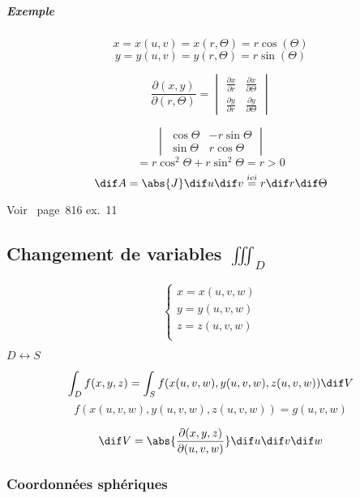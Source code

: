 \subparagraph{Exemple}



$$x=x(u,v)=x(r,\Theta)=r\cos(\Theta)$$
$$y=y(u,v)=y(r,\Theta)=r\sin(\Theta)$$





\[
\frac{\partial (x,y)}{\partial (r, \Theta)} =
\begin{vmatrix}
\frac{\partial x}{\partial r}& \frac{\partial x}{\partial \Theta}\\
\frac{\partial y}{\partial r}& \frac{\partial y}{\partial \Theta}
\end{vmatrix}
\]

$$\begin{vmatrix}
\cos\Theta & -r\sin\Theta\\
\sin\Theta & r\cos\Theta
\end{vmatrix}$$
\[=r\cos^2\Theta +r\sin^2\Theta = r > 0\]
$$\dif A = \abs{J}\dif u\dif v \overset{ici}{=}r \dif r \dif\Theta $$

\begin{myrem}

Voir~\cite{adams2013calculus} page~816 ex.~11 %
\end{myrem}

\subsection{Changement de variables $ \iiint_D $}
$$
\left\{
\begin{array}{l}
x=x(u,v,w)\\
y=y(u,v,w)\\
z=z(u,v,w)\\
\end{array}
\right.
$$

$D \longleftrightarrow S $

\[\int_D f(x,y,z) = \int_S f (x(u,v,w),y(u,v,w),z(u,v,w)) \dif V\]
\[f (x(u,v,w),y(u,v,w),z(u,v,w)) = g(u,v,w)\]

\[\dif V=\abs{\frac{\partial(x,y,z)}{\partial(u,v,w)}}\dif u\dif v\dif w\]



\subsubsection{Coordonnées sphériques}

